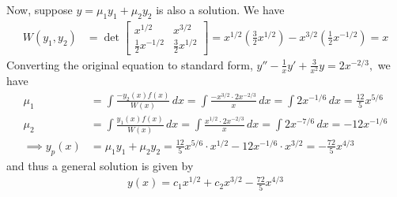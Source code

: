 \documentclass{article}
\begin{document}
\begin{enumerate}
\begin{soln}
			Now, suppose $y=\mu_1y_1+\mu_2y_2$ is also a solution. We have
			\begin{align*}
				W(y_1, y_2) &= \det \begin{bmatrix}
					x^{1/2} & x^{3/2} \\ \frac{1}{2}x^{-1/2} & \frac{3}{2}x^{1/2}
				\end{bmatrix} = x^{1/2} \left(\frac{3}{2} x^{1/2}\right) - x^{3/2}\left( \frac{1}{2}x^{-1/2} \right) = x
			\end{align*}
			Converting the original equation to standard form, $y'' -\frac{1}{x} y' + \frac{3}{x^2}y = 2x^{-2/3},$ we have
			\begin{align*}
				\mu_1 &= \int \frac{-y_2(x)f(x)}{W(x)}\, dx = \int \frac{-x^{3/2} \cdot 2x^{-2/3}}{x}\, dx = \int 2x^{-1/6}\, dx = \frac{12}{5} x^{5/6} \\
				\mu_2 &= \int \frac{y_1(x)f(x)}{W(x)}\, dx = \int \frac{x^{1/2}\cdot 2x^{-2/3}}{x}\, dx = \int 2x^{-7/6}\, dx = -12x^{-1/6} \\
				\implies y_p(x) &= \mu_1y_1 + \mu_2y_2 = \frac{12}{5}x^{5/6} \cdot x^{1/2} - 12x^{-1/6}\cdot x^{3/2} = -\frac{72}{5} x^{4/3}
			\end{align*}
			and thus a general solution is given by
			\begin{align*}
				y(x) = c_1x^{1/2} + c_2x^{3/2} - \frac{72}{5}x^{4/3}
			\end{align*}
		\end{soln}
		
\end{enumerate}
\end{document}
